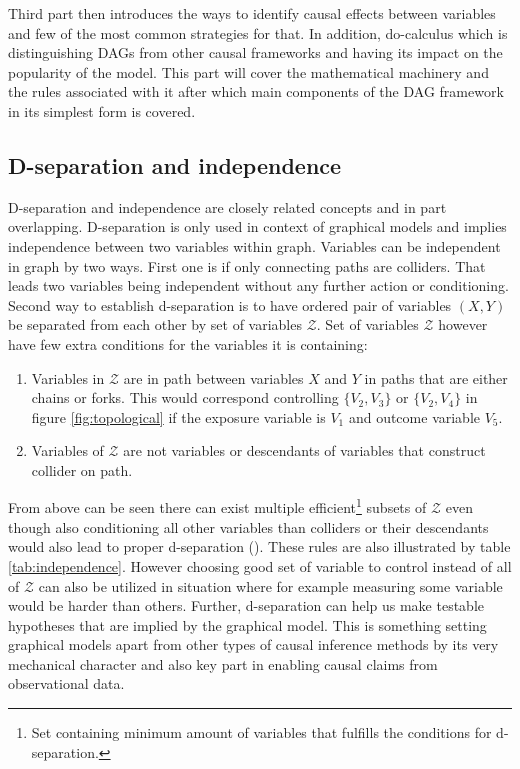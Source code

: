 \documentclass[main=english,12pt,a4paper,pdftex,econ,utf8]{aaltothesis}
\newcommand{\z}{\mathcal{Z}}
\begin{document}
Third part then introduces the ways to identify causal effects between variables and few of the most common strategies for that. In addition, do-calculus which is distinguishing DAGs from other causal frameworks and having its impact on the popularity of the model. This part will cover the mathematical machinery and the rules associated with it after which main components of the DAG framework in its simplest form is covered.

\subsection{D-separation and independence} \label{subsection:d and indep}

D-separation and independence are closely related concepts and in part overlapping. D-separation is only used in context of graphical models and implies independence between two variables within graph. Variables can be independent in graph by two ways. First one is if only connecting paths are colliders. That leads two variables being independent without any further action or conditioning. Second way to establish d-separation is to have ordered pair of variables $(X, Y)$ be separated from each other by set of variables $\z$. Set of variables $\z$ however have few extra conditions for the variables it is containing:

\begin{enumerate}
    \item Variables in $\z$ are in path between variables $X$ and $Y$ in paths that are either chains or forks. This would correspond controlling $\{V_{2},V_{3}\}$ or $\{V_{2},V_{4}\}$ in figure \ref{fig:topological} if the exposure variable is $V_{1}$ and outcome variable $V_{5}$.
    \item Variables of $\z$ are not variables or descendants of variables that construct collider on path.
\end{enumerate}

From above can be seen there can exist multiple efficient\footnote{Set containing minimum amount of variables that fulfills the conditions for d-separation.} subsets of $\z$ even though also conditioning all other variables than colliders or their descendants would also lead to proper d-separation (\cite{Pearl2016}). These rules are also illustrated by table \ref{tab:independence}. However choosing good set of variable to control instead of all of $\z$ can also be utilized in situation where for example measuring some variable would be harder than others. Further, d-separation can help us make testable hypotheses that are implied by the graphical model. This is something setting graphical models apart from other types of causal inference methods by its very mechanical character and also key part in enabling causal claims from observational data.
\end{document}
